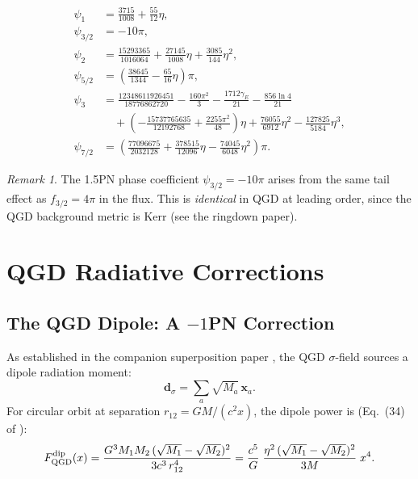 \documentclass[11pt,a4paper]{article}
\newcommand{\Fp}{F_{\rm QGD}^{\rm dip}}
\theoremstyle{definition}
\theoremstyle{remark}
\newtheorem{remark}{Remark}[section]
\newcommand{\boldx}{\mathbf{x}}
\begin{document}
	\begin{align}
		\psi_1   &= \frac{3715}{1008} + \frac{55}{12}\eta,
		\label{eq:psi1}\\
		\psi_{3/2} &= -10\pi,
		\label{eq:psi15}\\
		\psi_2   &= \frac{15293365}{1016064} + \frac{27145}{1008}\eta
		+ \frac{3085}{144}\eta^2,
		\label{eq:psi2}\\
		\psi_{5/2} &= \left(\frac{38645}{1344} - \frac{65}{16}\eta\right)\pi,
		\label{eq:psi25}\\
		\psi_3   &= \frac{12348611926451}{18776862720} - \frac{160\pi^2}{3}
		- \frac{1712\gamma_E}{21} - \frac{856\ln 4}{21}
		\nonumber\\
		&\quad
		+ \left(-\frac{15737765635}{12192768} + \frac{2255\pi^2}{48}\right)\eta
		+ \frac{76055}{6912}\eta^2 - \frac{127825}{5184}\eta^3,
		\label{eq:psi3}\\
		\psi_{7/2} &= \left(\frac{77096675}{2032128} + \frac{378515}{12096}\eta
		- \frac{74045}{6048}\eta^2\right)\pi.
		\label{eq:psi35}
	\end{align}
	
	\begin{remark}
		The 1.5PN phase coefficient $\psi_{3/2}=-10\pi$ arises from the
		same tail effect as $f_{3/2}=4\pi$ in the flux.  This is
		\emph{identical} in QGD at leading order, since the QGD background
		metric is Kerr (see the ringdown paper).
	\end{remark}
	
	\section{QGD Radiative Corrections}
	\label{sec:qgd_radiative}
	
	\subsection{The QGD Dipole: A $-1$PN Correction}
	
	As established in the companion superposition paper
	\cite{QGDSuperposition}, the QGD $\sigma$-field sources a dipole
	radiation moment:
	\begin{equation}
		\boldsymbol{d}_\sigma = \sum_a \sqrt{M_a}\,\boldx_a.
	\end{equation}
	For circular orbit at separation $r_{12}=GM/(c^2 x)$, the dipole
	power is (Eq.~(34) of \cite{QGDSuperposition}):
	\begin{equation}
		\Fp(x)
		= \frac{G^3 M_1 M_2\,(\sqrt{M_1}-\sqrt{M_2})^2}{3c^3\,r_{12}^4}
		= \frac{c^5}{G}\;\frac{\eta^2\,(\sqrt{M_1}-\sqrt{M_2})^2}{3M}\;x^4.
		\label{eq:dipole_flux}
	\end{equation}
	
\end{document}
